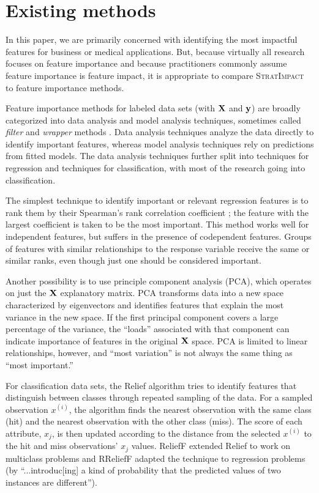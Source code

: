 \documentclass[11pt]{article}
\newcommand{\simp}{\fontfamily{cmr}\textsc{\small StratImpact}}
\renewcommand{\xi}{x^{(i)}}
\begin{document}
 
\section{Existing methods}\label{sec:existing}

In this paper, we are primarily concerned with identifying the most impactful features for business or medical applications. But, because virtually all research focuses on feature importance and because practitioners commonly assume feature importance is feature impact, it is appropriate to compare \simp{} to  feature importance methods.

Feature importance methods for labeled data sets (with $\bf X$ and $\bf y$) are broadly categorized into data analysis and model analysis techniques, sometimes called {\em filter} and {\em wrapper} methods \citep{tsanas}. Data analysis techniques analyze the data directly to identify important features, whereas model analysis techniques rely on predictions from fitted models.  The data analysis techniques further split into techniques for regression and techniques for classification, with most of the research going into classification.

The simplest technique to identify important or relevant regression features is to rank them by their Spearman's rank correlation coefficient \citep{spearmans}; the feature with the largest coefficient is taken to be the most important. This method works well for independent features, but suffers in the presence of codependent features.   Groups of features with similar relationships to the response variable receive the same or similar ranks, even though just one should be considered important.

Another possibility is to use principle component analysis (PCA), which operates on just the $\bf X$ explanatory matrix. PCA transforms data into a new space characterized by eigenvectors and identifies features that explain the most variance in the new space. If the first principal component covers a large percentage of the variance, the ``loads'' associated with that component can indicate importance of features in the original $\bf X$ space. PCA is limited to linear relationships, however, and ``most variation'' is not always the same thing as ``most important.''

For classification data sets, the Relief algorithm \citep{relief} tries to identify features that distinguish between classes through repeated sampling of the data. For a sampled observation $\xi$, the algorithm finds the nearest observation with the same class (hit) and the nearest observation with the other class (miss). The score of each attribute, $x_j$, is then updated according to the distance from the selected $\xi$ to the hit and miss observations'  $x_j$ values. ReliefF \citep{ReliefF} extended Relief to work on multiclass problems and RReliefF \citep{RReliefF} adapted the technique to regression problems (by ``...introduc[ing] a kind of probability that the predicted values of two instances are different'').
\end{document}
